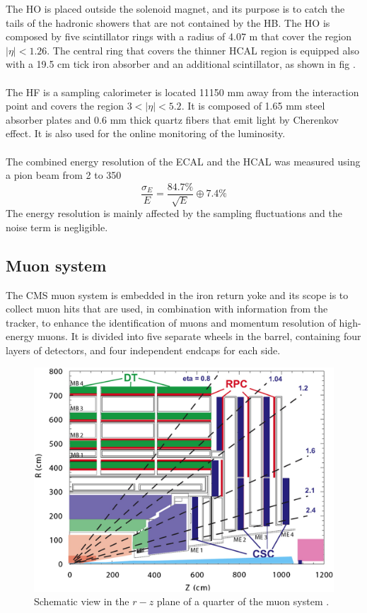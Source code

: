 The HO is placed outside the solenoid magnet, and its purpose is to catch the tails of the hadronic showers that are not contained by the HB. The HO is composed by five scintillator rings with a radius of 4.07 m that cover the region $|\eta|<1.26$. The central ring that covers the thinner HCAL region is equipped also with a 19.5 cm tick iron absorber and an additional scintillator, as shown in fig .\\
\\
The HF is a sampling calorimeter is located 11150 mm away from the interaction point and covers the region $3<|\eta|<5.2$. It is composed of 1.65 mm steel absorber plates and 0.6 mm thick quartz fibers that emit light by Cherenkov effect. It is also used for the online monitoring of the luminosity.
\\
\\
The combined energy resolution of the ECAL and the HCAL was measured using a pion beam from 2 \GeV to 350 \GeV \cite{Abdullin2008TheGeV/c}
\begin{equation}
    \frac{\sigma_E}{E}= \frac{84.7\%}{\sqrt{E}} \oplus 7.4 \%
\end{equation}
The energy resolution is mainly affected by the sampling fluctuations and the noise term is negligible.

\subsection{Muon system}
The CMS muon system \cite{Layter1997TheReport} is embedded in the iron return yoke and its scope is to collect muon hits that are used, in combination with information from the tracker, to enhance the identification of muons and momentum resolution of high-energy muons.
It is divided into five separate wheels in the barrel, containing four layers of detectors, and four independent endcaps for each side.

\begin{figure}[h!]
    \centering
    \includegraphics[width=0.85\linewidth]{fig//chap03-cms/muon_system.jpg}
    \caption{Schematic view in the $r-z$ plane of a quarter of the muon system \cite{Piccolo2011CMSPerformance}.}
    \label{fig:muon_system}
\end{figure}


